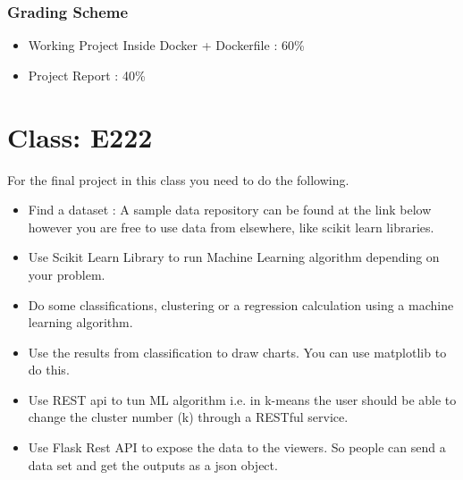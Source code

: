 \subsubsection{Grading Scheme}

\begin{itemize}
\item Working Project Inside Docker + Dockerfile : 60\%
\item Project Report : 40\%
\end{itemize}

\section{Class: E222}\label{s:classe22-proj}

For the final project in this class you need to do the following.

\begin{itemize}
\item Find a dataset : A sample data repository can be found at the
  link below however you are free to use data from elsewhere, like
  scikit learn libraries. 
\item Use Scikit Learn Library to run Machine Learning algorithm
  depending on your problem.
\item Do some classifications, clustering or a regression calculation
  using a machine learning algorithm.
\item Use the results from classification to draw charts. You can use
  matplotlib to do this.
\item Use REST api to tun ML algorithm i.e. in k-means the user
  should be able to change the cluster number (k) through a RESTful
  service.
\item Use Flask Rest API to expose the data to the viewers. So people
  can send a data set and get the outputs as a json object.
\end{itemize}

